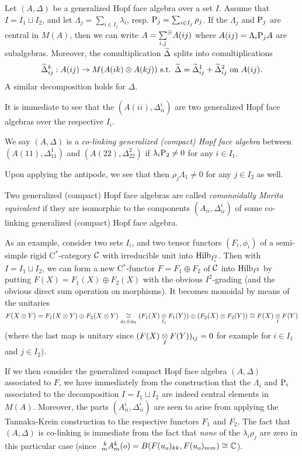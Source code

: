Let $(A,\Delta)$ be a generalized Hopf face algebra over a set $I$. Assume that $I = I_1\sqcup I_2$, and let $\Lambda_j = \sum_{i\in I_j}\lambda_i$, resp. $\Rho_j = \sum_{i\in I_j} \rho_j$. If the $\Lambda_j$ and $\Rho_j$ are central in $M(A)$, then we can write $A = \osum{i,j} A(ij)$ where $A(ij) = \Lambda_i\Rho_jA$ are subalgebras. Moreover, the comultiplication $\wDelta$ splits into comultiplications \[\wDelta_{ij}^k:A(ij)\rightarrow M(A(ik)\otimes A(kj))\textrm{ s.t. } \wDelta = \wDelta_{ij}^1 +\wDelta_{ij}^2 \textrm{ on }A(ij).\] A similar decomposition holds for $\Delta$.

It is immediate to see that the $(A(ii),\Delta_{ii}^i)$ are two generalized Hopf face algebras over the respective $I_i$.

\begin{Def} We say $(A,\Delta)$ is a \emph{co-linking generalized (compact) Hopf face algebra} between $(A(11),\Delta_{11}^1)$ and $(A(22),\Delta_{22}^2)$ if $\lambda_i\Rho_2\neq 0$ for any $i\in I_1$.
\end{Def}

Upon applying the antipode, we see that then $\rho_j\Lambda_1\neq 0$ for any $j\in I_2$ as well.

\begin{Def} Two generalized (compact) Hopf face algebras are called \emph{comonoidally Morita equivalent} if they are isomorphic to the components $(A_{ii},\Delta_{ii}^i)$ of some co-linking generalized (compact) Hopf face algebra.\end{Def}

As an example, consider two sets $I_i$, and two tensor functors $(F_i,\phi_i)$ of a semi-simple rigid C$^*$-category $\CatC$ with irreducible unit into $\Hilb_{I_i^2}$. Then with $I= I_1\sqcup I_2$, we can form a new C$^*$-functor $F=F_1\oplus F_2$ of $\CatC$ into $\Hilb_{I^2}$ by putting $F(X) = F_1(X)\oplus F_2(X)$ with the obvious $I^2$-grading (and the obvious direct sum operation on morphisms). It becomes monoidal by means of the unitaries \[F(X\otimes Y) = F_1(X\otimes Y)\oplus F_2(X\otimes Y) \underset{\phi_1\oplus \phi_2}{\cong} (F_1(X)\underset{I_1}{\otimes} F_1(Y)) \oplus (F_2(X)\otimes F_2(Y)) \cong F(X)\iitimes F(Y)\] (where the last map is unitary since $(F(X)\iitimes F(Y))_{ij}=0$ for example for $i\in I_1$ and $j\in I_2$).

If we then consider the generalized compact Hopf face algebra $(A,\Delta)$ associated to $F$, we have immediately from the construction that the $\Lambda_i$ and $\Rho_i$ associated to the decomposition $I = I_1\sqcup I_2$ are indeed central elements in $M(A)$. Moreover, the parts $(A_{ii}^i,\Delta_{ii}^i)$ are seen to arise from applying the Tannaka-Krein construction to the respective functors $F_1$ and $F_2$. The fact that $(A,\Delta)$ is co-linking is immediate from the fact that \emph{none} of the $\lambda_i\rho_j$ are zero in this particular case (since $\Gr{A}{k}{k}{m}{m}(o) = B(F(u_o)_{kk},F(u_o)_{mm}) \cong \C$).


